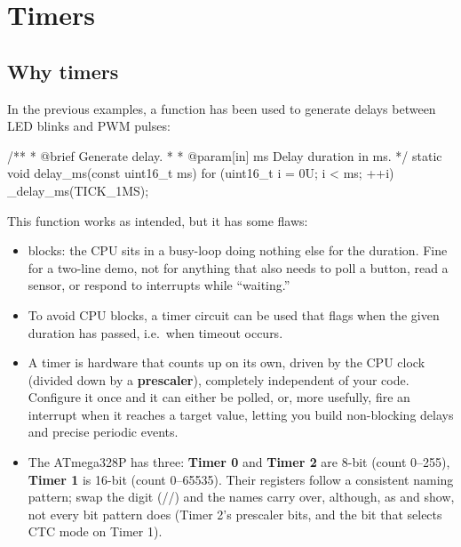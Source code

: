 
\section{Timers}
\label{c5:sec:timers}\label{c5:app:a}

\subsection{Why timers}
\label{c5:a:1}
In the previous examples, a function  has been used to generate delays between LED
blinks and PWM pulses:

\begin{ccode}
/**
 * @brief Generate delay.
 *
 * @param[in] ms Delay duration in ms.
 */
static void delay_ms(const uint16_t ms)
{
    for (uint16_t i = 0U; i < ms; ++i)
    {
        _delay_ms(TICK_1MS);
    }
}
\end{ccode}

\noindent This function works as intended, but it has some flaws:
\begin{itemize}
  \item {} blocks: the CPU sits in a busy-loop doing nothing else for the duration.
    Fine for a two-line demo, not for anything that also needs to poll a button, read a sensor, or
    respond to interrupts while ``waiting.''
  \item To avoid CPU blocks, a timer circuit can be used that flags when the given duration has
    passed, i.e.\ when timeout occurs.
  \item A timer is hardware that counts up on its own, driven by the CPU clock (divided down by a
    \textbf{prescaler}), completely independent of your code. Configure it once and it can either
    be polled, or, more usefully, fire an interrupt when it reaches a target value, letting you
    build non-blocking delays and precise periodic events.
  \item The ATmega328P has three: \textbf{Timer 0} and \textbf{Timer 2} are 8-bit (count
    0--255), \textbf{Timer 1} is 16-bit (count 0--65535). Their registers follow a consistent
    naming pattern; swap the digit (//) and the names carry over,
    although, as  and  show, not every bit pattern does (Timer 2's
    prescaler bits, and the bit that selects CTC mode on Timer 1).
\end{itemize}

